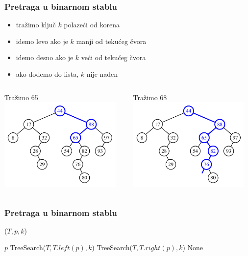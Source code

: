 \documentclass[compress]{beamer}
\renewcommand{\algorithmiccomment}[1]{\hfill \{\myred{#1}\}}
\begin{document}
\begin{frame}[fragile]
  \frametitle{Pretraga u binarnom stablu}
  \begin{itemize}
    \item tražimo ključ $k$ polazeći od korena
    \item idemo levo ako je $k$ manji od tekućeg čvora
    \item idemo desno ako je $k$ veći od tekućeg čvora
    \item ako dođemo do lista, $k$ nije nađen
  \end{itemize}
  \begin{columns}
    \begin{column}[c]{6cm}
      \begin{center}
        Tražimo 65
        \includegraphics[width=6cm]{asp-11-pic03a.pdf}
      \end{center}
    \end{column}  
    \begin{column}[c]{6cm}
      \begin{center}
        Tražimo 68
        \includegraphics[width=6cm]{asp-11-pic03b.pdf}
      \end{center}
    \end{column}  
  \end{columns}
\end{frame}

\renewcommand{\algorithmiccomment}[1]{\hfill \{\myred{#1}\}}

\begin{frame}[fragile]
  \frametitle{Pretraga u binarnom stablu}
($T, p, k$)
\begin{algorithmic}
  \RETURN $p$ 
  \RETURN TreeSearch($T, T.left(p), k$) 
  \RETURN TreeSearch($T, T.right(p), k$) 
\ENDIF
\RETURN None  
\end{algorithmic}
\end{frame}
\end{document}
